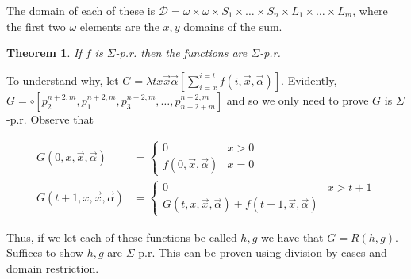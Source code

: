\documentclass[a4paper, 12pt]{article}
\newtheorem{theorem}{Theorem}
\newtheorem{theorem}{Theorem}
\begin{document}
The domain of each of these is $\mathcal{D} = \omega \times  \omega \times S_1
\times\ldots \times S_n \times L_1 \times  \ldots \times L_m$, where the first
two $\omega$ elements are the $x, y$ domains of the sum.

\begin{theorem}
    If $f$ is $\Sigma$-p.r. then the functions are $\Sigma$-p.r.
\end{theorem}

To understand why, let $G = \lambda tx \overrightarrow{x}\overrightarrow{\alpha}
\left[\sum_{i=x}^{i=t} f(i, \overrightarrow{x},
\overrightarrow{\alpha})\right]$. Evidently, $G = \circ \left[ p_2^{n+2, m},
p_1^{n + 2, m}, p_3^{n+2, m}, \ldots, p_{n+2+m}^{n+2, m} \right] $ and so we
only need to prove $G$ is $\Sigma$-p.r. Observe that 

\begin{align*}
    G(0, x, \overrightarrow{x}, \overrightarrow{\alpha}) &= \begin{cases}
        0 & x > 0 \\ 
        f(0, \overrightarrow{x}, \overrightarrow{\alpha}) & x = 0
    \end{cases} \\ 
    G(t + 1, x, \overrightarrow{x}, \overrightarrow{\alpha}) &= \begin{cases}
        0 & x > t  +1 \\ 
        G(t, x, \overrightarrow{x}, \overrightarrow{\alpha}) + f(t+1,
        \overrightarrow{x}, \overrightarrow{\alpha})
    \end{cases}
\end{align*}

Thus, if we let each of these functions be called $h, g$ we have that $G = R(h,
g)$. Suffices to show $h, g$ are $\Sigma$-p.r. This can be proven using
division by cases and domain restriction.
\end{document}
